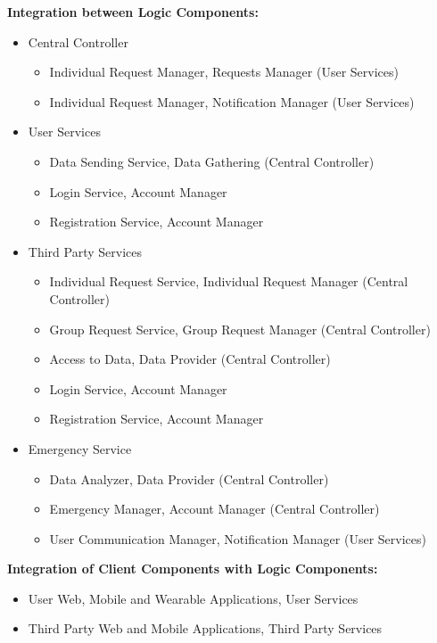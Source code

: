 \textbf{Integration between Logic Components:}
\begin{itemize}
    \item Central Controller
    \begin{itemize}
        \item Individual Request Manager, Requests Manager (User Services)
        \item Individual Request Manager, Notification Manager (User Services)
    \end{itemize}
    \item User Services
    \begin{itemize}
        \item Data Sending Service, Data Gathering (Central Controller)
        \item Login Service, Account Manager
        \item Registration Service, Account Manager
    \end{itemize}
    \item Third Party Services
    \begin{itemize}
        \item Individual Request Service, Individual Request Manager (Central Controller)
        \item Group Request Service, Group Request Manager (Central Controller)
        \item Access to Data, Data Provider (Central Controller)
        \item Login Service, Account Manager
        \item Registration Service, Account Manager
    \end{itemize}
    \item Emergency Service
    \begin{itemize}
        \item Data Analyzer, Data Provider (Central Controller)
        \item Emergency Manager, Account Manager (Central Controller)
        \item User Communication Manager, Notification Manager (User Services)
    \end{itemize}
\end{itemize}

\textbf{Integration of Client Components with Logic Components:}
\begin{itemize}
    \item User Web, Mobile and Wearable Applications, User Services
    \item Third Party Web and Mobile Applications, Third Party Services
\end{itemize}

